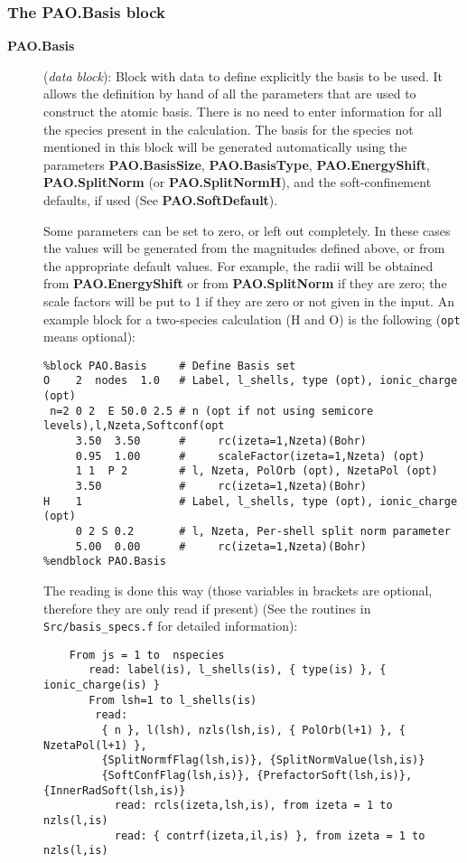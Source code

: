 \documentclass[11pt]{article}
\begin{document}
\subsubsection{The PAO.Basis block}
\begin{description}
     
\item[{\bf PAO.Basis}] ({\it data block}):  
Block with data to define explicitly the
basis to be used.  It allows the definition by hand of all the
parameters that are used to construct the atomic basis. There is no
need to enter information for all the species present in the
calculation. The basis for the species not mentioned in
this block will be generated automatically using the parameters {\bf
PAO.BasisSize}, {\bf PAO.BasisType}, {\bf PAO.EnergyShift}, {\bf
PAO.SplitNorm} (or {\bf PAO.SplitNormH}), and the soft-confinement
defaults, if used (See {\bf PAO.SoftDefault}). 

Some parameters can be set to zero, or
left out completely.  In these cases the values will be generated from the
magnitudes defined above, or from the appropriate default values. For
example, the radii will be obtained from {\bf
PAO.EnergyShift} or from {\bf PAO.SplitNorm} if they are zero; the
scale factors will be put to 1 if they are zero or not given in the
input.  An example block for a two-species calculation (H and O) is
the following ({\tt opt} means optional):

\begin{verbatim}
%block PAO.Basis     # Define Basis set
O    2  nodes  1.0   # Label, l_shells, type (opt), ionic_charge (opt)
 n=2 0 2  E 50.0 2.5 # n (opt if not using semicore levels),l,Nzeta,Softconf(opt
     3.50  3.50      #     rc(izeta=1,Nzeta)(Bohr)
     0.95  1.00      #     scaleFactor(izeta=1,Nzeta) (opt)
     1 1  P 2        # l, Nzeta, PolOrb (opt), NzetaPol (opt)
     3.50            #     rc(izeta=1,Nzeta)(Bohr)
H    1               # Label, l_shells, type (opt), ionic_charge (opt)
     0 2 S 0.2       # l, Nzeta, Per-shell split norm parameter
     5.00  0.00      #     rc(izeta=1,Nzeta)(Bohr)
%endblock PAO.Basis
\end{verbatim}

\noindent
The reading is done this way (those variables in brackets are
optional, therefore they are only read if present) (See 
the routines in {\tt Src/basis\_specs.f} for detailed information):

\begin{verbatim}
    From js = 1 to  nspecies 
       read: label(is), l_shells(is), { type(is) }, { ionic_charge(is) }
       From lsh=1 to l_shells(is)
        read: 
         { n }, l(lsh), nzls(lsh,is), { PolOrb(l+1) }, { NzetaPol(l+1) },
         {SplitNormfFlag(lsh,is)}, {SplitNormValue(lsh,is)}
         {SoftConfFlag(lsh,is)}, {PrefactorSoft(lsh,is)}, {InnerRadSoft(lsh,is)}
           read: rcls(izeta,lsh,is), from izeta = 1 to nzls(l,is)
           read: { contrf(izeta,il,is) }, from izeta = 1 to nzls(l,is)
\end{verbatim}


\end{description}
\end{document}
